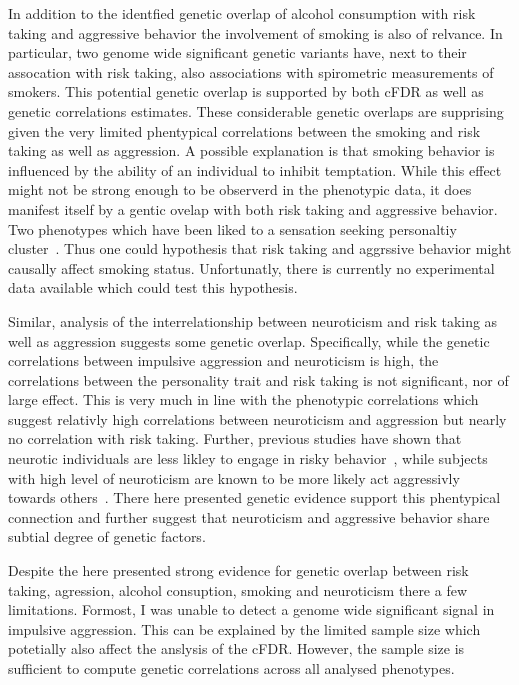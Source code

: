 In addition to the identfied genetic overlap of alcohol consumption with risk taking and aggressive behavior the involvement of smoking is also of relvance.
In particular, two genome wide significant genetic variants have, next to their assocation with risk taking, also associations with spirometric measurements of smokers.
This potential genetic overlap is supported by both cFDR as well as genetic correlations estimates.
These considerable genetic overlaps are supprising given the very limited phentypical correlations between the smoking and risk taking as well as aggression.
A possible explanation is that smoking behavior is influenced by the ability of an individual to  inhibit temptation.
While this effect might not be strong enough to be observerd in the phenotypic data, it does manifest itself by a gentic ovelap with both risk taking and aggressive behavior.
Two phenotypes which have been liked to a sensation seeking personaltiy cluster~\cite{Zuckerman2000}.
Thus one could hypothesis that risk taking and aggrssive behavior might causally affect smoking status.
Unfortunatly, there is currently no experimental data available which could test this hypothesis.

Similar, analysis of the interrelationship between neuroticism and risk taking as well as aggression suggests some genetic overlap.
Specifically, while the genetic correlations between impulsive aggression and neuroticism is high, the correlations between the personality trait and risk taking is not significant, nor of large effect.
This is very much in line with the phenotypic correlations which suggest relativly high correlations between neuroticism and aggression but nearly no correlation with risk taking.
Further, previous studies have shown that neurotic individuals are less likley to engage in risky behavior~\cite{lauriola2001,instituteofmedicine2011,paulus2003}, while subjects with high level of neuroticism are known to be more likely act aggressivly towards others~\cite{Meesters2007}.
There here presented genetic evidence support this phentypical connection and further suggest that neuroticism and aggressive behavior share subtial degree of genetic factors.

Despite the here presented strong evidence for genetic overlap between risk taking, agression, alcohol consuption, smoking and neuroticism there a few limitations.
Formost, I was unable to detect a genome wide significant signal in impulsive aggression.
This can be explained by the limited sample size which potetially also affect the anslysis of the cFDR\@.
However, the sample size is sufficient to compute genetic correlations across all analysed phenotypes.

